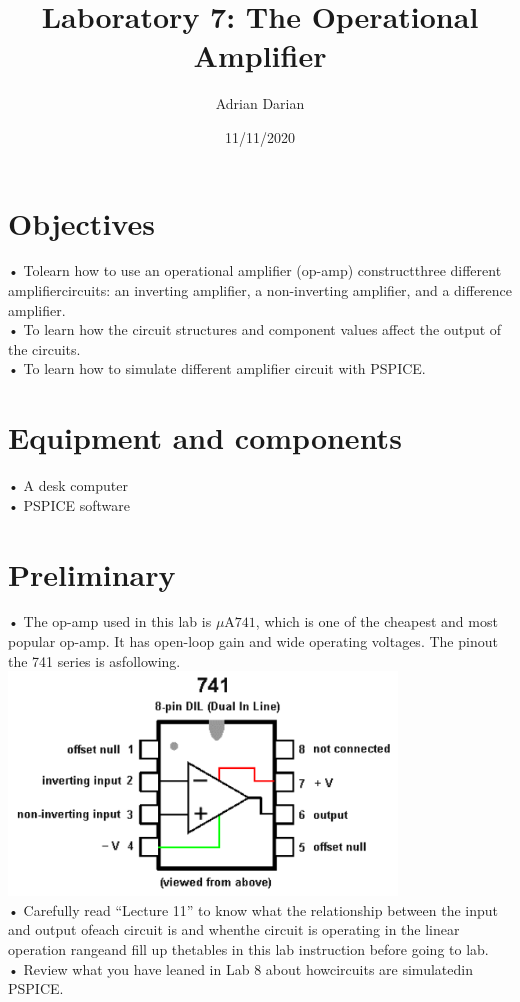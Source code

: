 \documentclass[a4paper]{article}
\title{Laboratory 7: The Operational Amplifier}
\author{Adrian Darian}
\date{11/11/2020}
\begin{document}
  
\maketitle
  
\section*{Objectives}
• Tolearn how to use an operational amplifier (op-amp) constructthree different amplifiercircuits: an inverting amplifier, a non-inverting amplifier, and a difference amplifier. \\
• To learn how the circuit structures and component values affect the output of the circuits. \\
• To learn how to simulate different amplifier circuit with PSPICE. \\

\section*{Equipment and components}
• A desk computer \\
• PSPICE software \\

\section*{Preliminary}
• The op-amp used in this lab is $\si{\mu\ampere}741$, which is one of the cheapest and most popular op-amp. It has open-loop gain and wide operating voltages. The pinout the 741 series is asfollowing. \\
\includegraphics{741.png} \\ 
• Carefully read “Lecture 11” to know what the relationship between the input and output ofeach circuit is and whenthe circuit is operating in the linear operation rangeand fill up thetables in this lab instruction before going to lab. \\
• Review what you have leaned in Lab 8 about howcircuits are simulatedin PSPICE.
\end{document}
